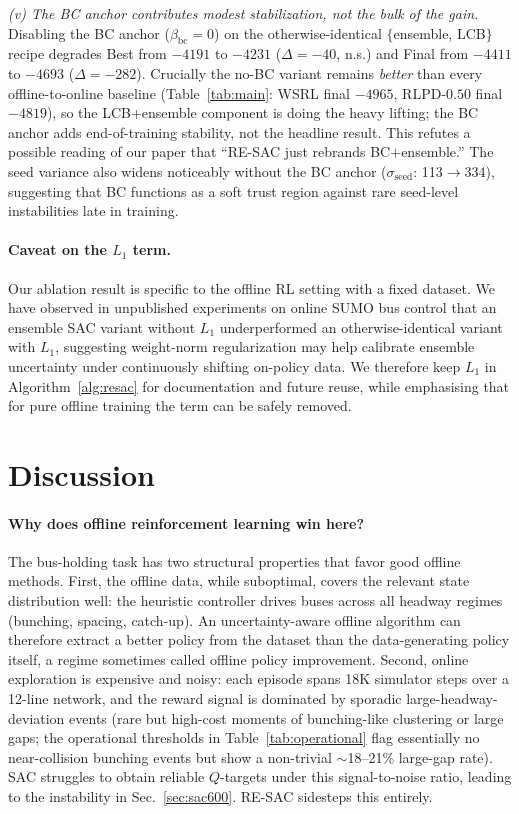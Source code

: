 \documentclass[journal,10pt]{IEEEtran}
\begin{document}
\emph{(v) The BC anchor contributes modest stabilization, not the bulk of the gain.} Disabling the BC anchor ($\beta_{\text{bc}}=0$) on the otherwise-identical $\{$ensemble, LCB$\}$ recipe degrades Best from $-4191$ to $-4231$ ($\Delta = -40$, n.s.) and Final from $-4411$ to $-4693$ ($\Delta = -282$). Crucially the no-BC variant remains \emph{better} than every offline-to-online baseline (Table~\ref{tab:main}: WSRL final $-4965$, RLPD-$0.50$ final $-4819$), so the LCB+ensemble component is doing the heavy lifting; the BC anchor adds end-of-training stability, not the headline result. This refutes a possible reading of our paper that ``RE-SAC just rebrands BC$+$ensemble.'' The seed variance also widens noticeably without the BC anchor ($\sigma_{\text{seed}}$: 113$\to$334), suggesting that BC functions as a soft trust region against rare seed-level instabilities late in training.

\paragraph{Caveat on the $L_1$ term.} Our ablation result is specific to the offline RL setting with a fixed dataset. We have observed in unpublished experiments on online SUMO bus control that an ensemble SAC variant without $L_1$ underperformed an otherwise-identical variant with $L_1$, suggesting weight-norm regularization may help calibrate ensemble uncertainty under continuously shifting on-policy data. We therefore keep $L_1$ in Algorithm~\ref{alg:resac} for documentation and future reuse, while emphasising that for pure offline training the term can be safely removed.

\section{Discussion}
\label{sec:discussion}

\paragraph{Why does offline reinforcement learning win here?} The bus-holding task has two structural properties that favor good offline methods. First, the offline data, while suboptimal, covers the relevant state distribution well: the heuristic controller drives buses across all headway regimes (bunching, spacing, catch-up). An uncertainty-aware offline algorithm can therefore extract a better policy from the dataset than the data-generating policy itself, a regime sometimes called offline policy improvement. Second, online exploration is expensive and noisy: each episode spans 18K simulator steps over a 12-line network, and the reward signal is dominated by sporadic large-headway-deviation events (rare but high-cost moments of bunching-like clustering or large gaps; the operational thresholds in Table~\ref{tab:operational} flag essentially no near-collision bunching events but show a non-trivial $\sim$18--21\% large-gap rate). SAC struggles to obtain reliable $Q$-targets under this signal-to-noise ratio, leading to the instability in Sec.~\ref{sec:sac600}. RE-SAC sidesteps this entirely.
\end{document}
